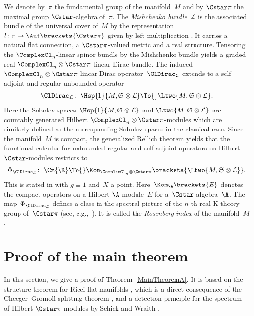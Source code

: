\documentclass[pdftex]{sigma}
\numberwithin{equation}{section}
\newcommand{\ClSpinBdl}{\mathfrak{S}}
\newcommand{\ClDL}{\ClDirac_{\mathcal{L}}}
\begin{document}
We denote by~$\pi$ the fundamental group of the manifold~$M$ and by $\Cstar \pi$ the maximal group $\Cstar$-algebra of~$\pi$. The \textit{Mishchenko bundle}~$\mathcal{L}$ is the associated bundle of the universal cover of~$M$ by the representation $l \colon \pi \to \Aut\brackets{\Cstar \pi}$ given by left multiplication \cite{Mishchenko1980}. It carries a natural flat connection, a $\Cstar \pi$-valued metric and a real structure. Tensoring the $\ComplexCl_n$-linear spinor bundle by the Mishchenko bundle yields a graded real $\ComplexCl_n\otimes \Cstar \pi$-linear Dirac bundle. The induced~${\ComplexCl_n \otimes \Cstar \pi}$-linear Dirac operator~$\ClDirac_{\mathcal{L}}$ extends to a self-adjoint and regular unbounded operator
\[
 \ClDL\colon\ \Hsp{1}{M,\ClSpinBdl\otimes \mathcal{L}} \To{} \Ltwo{M,\ClSpinBdl\otimes \mathcal{L}}.
\]
Here the Sobolev spaces~$\Hsp{1}{M,\ClSpinBdl\otimes \mathcal{L}}$ and $\Ltwo{M,\ClSpinBdl\otimes \mathcal{L}}$ are countably generated Hilbert $\ComplexCl_n\otimes \Cstar \pi$-modules which are similarly defined as the corresponding Sobolev spaces in the classical case. Since the manifold~$M$ is compact, the generalized Rellich theorem \cite[Theorem~2.33]{Ebert2016} yields that the functional calculus for unbounded regular and self-adjoint operators on Hilbert $\Cstar$-modules \cite[Theorem~1.19]{Ebert2016} restricts to
\begin{gather} \label{FunctionalCalculus}
 \Phi_{\ClDirac_{\mathcal{L}}}\colon\ \Cz{\R} \To{} \Kom_{\ComplexCl_n\otimes \Cstar \pi} \brackets{\Ltwo{M,\ClSpinBdl\otimes \mathcal{L}}}.
\end{gather}
This is stated in \cite[Proposition~2.34]{Ebert2016} with $g\equiv 1$ and~$X$ a point. Here~$\Kom_{\A}\brackets{E}$ denotes the compact operators on a Hilbert $\A$-module~$E$ for a~$\Cstar$-algebra~$\A$. The map~$\Phi_{\ClDirac_{\mathcal{L}}}$ defines a class in the spectral picture of the $n$-th real K-theory group of~$\Cstar \pi$ (see, e.g.,~\cite[Lecture 13]{Roe}). It is called the \textit{Rosenberg index} of the manifold~$M$.

\section{Proof of the main theorem} \label{SectionProofThmA}

In this section, we give a proof of Theorem~\ref{MainTheoremA}. It is based on the structure theorem for Ricci-flat manifolds \cite[Theorem~4.5]{Fischer1975}, which is a direct consequence of the Cheeger--Gromoll splitting theorem \cite{Cheeger1971}, and a detection principle for the spectrum of Hilbert $\Cstar \pi$-modules by Schick and Wraith \cite{Schick2021a}.
\end{document}
